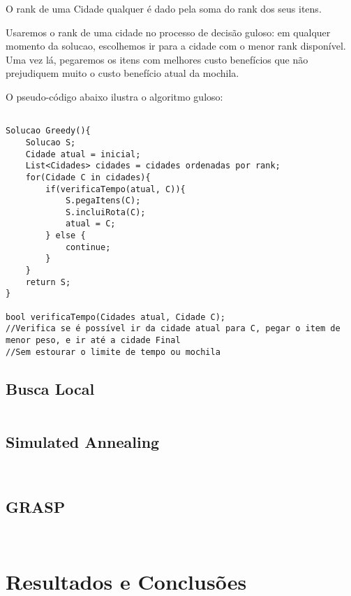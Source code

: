 \documentclass[12pt,14paper,onecolumn]{article}
\begin{document}
O rank de uma Cidade qualquer é dado pela soma do rank dos seus itens.

Usaremos o rank de uma cidade no processo de decisão guloso: em qualquer momento da solucao, escolhemos ir para a cidade com o menor rank disponível. Uma vez lá, pegaremos os itens com melhores custo benefícios que não prejudiquem muito o custo benefício atual da mochila.

O pseudo-código abaixo ilustra o algoritmo guloso:

\begin{lstlisting}

Solucao Greedy(){
	Solucao S;
	Cidade atual = inicial;
	List<Cidades> cidades = cidades ordenadas por rank;
	for(Cidade C in cidades){
		if(verificaTempo(atual, C)){
			S.pegaItens(C);
			S.incluiRota(C);
			atual = C;
		} else {
			continue;
		}
	}
	return S;
}

bool verificaTempo(Cidades atual, Cidade C);
//Verifica se é possível ir da cidade atual para C, pegar o item de menor peso, e ir até a cidade Final
//Sem estourar o limite de tempo ou mochila

\end{lstlisting}

\subsection{Busca Local}

\begin{lstlisting}

\end{lstlisting}

\subsection{Simulated Annealing}

\begin{lstlisting}


\end{lstlisting}

\subsection{GRASP}

\begin{lstlisting}


\end{lstlisting}


\section{Resultados e Conclusões}
\end{document}
